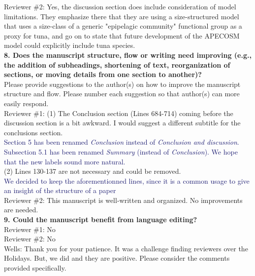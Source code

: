 \documentclass[12pt]{article}
\newcommand{\resp}[1]{\textcolor{MidnightBlue}{#1}}
\begin{document}
Reviewer \#2: Yes, the discussion section does include consideration of model limitations. They emphasize there that they are using a size-structured model that uses a size-class of a generic "epipelagic community" functional group as a proxy for tuna, and go on to state that future development of the APECOSM model could explicitly include tuna species.\\

\textbf{8. Does the manuscript structure, flow or writing need improving (e.g., the addition of subheadings, shortening of text, reorganization of sections, or moving details from one section to another)?}\\

Please provide suggestions to the author(s) on how to improve the manuscript structure and flow. Please number each suggestion so that author(s) can more easily respond.\\

Reviewer \#1: (1) The Conclusion section (Lines 684-714) coming before the discussion section is a bit awkward. I would suggest a different subtitle for the conclusions section.\\

\resp{Section 5 has been renamed \emph{Conclusion} instead of \emph{Conclusion and discussion}. Subsection 5.1 has been renamed \emph{Summary} (instead of \emph{Conclusion}). We hope that the new labels sound more natural.} \\

(2) Lines 130-137 are not necessary and could be removed.\\

\resp{We decided to keep the aforementionned lines, since it is a common usage to give an insight of the structure of a paper} \\

Reviewer \#2: This manuscript is well-written and organized. No improvements are needed.\\

\textbf{9. Could the manuscript benefit from language editing?}\\

Reviewer \#1: No\\

Reviewer \#2: No\\

Wells: Thank you for your patience. It was a challenge finding reviewers over the Holidays. But, we did and they are positive. Please consider the comments provided specifically.\\
\end{document}
